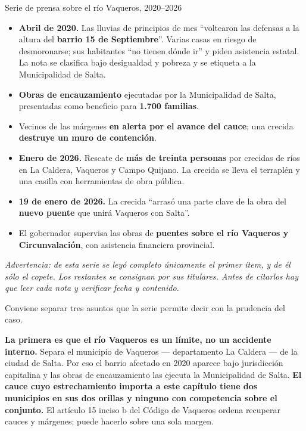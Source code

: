 \begin{ficha}{Serie de prensa sobre el río Vaqueros, 2020--2026}
\begin{itemize}[leftmargin=*,nosep]
\item \textbf{Abril de 2020.} Las lluvias de principios de mes ``voltearon las defensas a la altura del \textbf{barrio 15 de Septiembre}''. Varias casas en riesgo de desmoronarse; sus habitantes ``no tienen dónde ir'' y piden asistencia estatal. La nota se clasifica bajo desigualdad y pobreza y se etiqueta a la Municipalidad de Salta.
\item \textbf{Obras de encauzamiento} ejecutadas por la Municipalidad de Salta, presentadas como beneficio para \textbf{1.700 familias}.
\item Vecinos de las márgenes \textbf{en alerta por el avance del cauce}; una crecida \textbf{destruye un muro de contención}.
\item \textbf{Enero de 2026.} Rescate de \textbf{más de treinta personas} por crecidas de ríos en La Caldera, Vaqueros y Campo Quijano. La crecida se lleva el terraplén y una casilla con herramientas de obra pública.
\item \textbf{19 de enero de 2026.} La crecida ``arrasó una parte clave de la obra del \textbf{nuevo puente} que unirá Vaqueros con Salta''.
\item El gobernador supervisa las obras de \textbf{puentes sobre el río Vaqueros y Circunvalación}, con asistencia financiera provincial.
\end{itemize}
\textit{Advertencia: de esta serie se leyó completo únicamente el primer ítem, y de él sólo el copete. Los restantes se consignan por sus titulares. Antes de citarlos hay que leer cada nota y verificar fecha y contenido.}
\end{ficha}

Conviene separar tres asuntos que la serie permite decir con la prudencia del caso.

\textbf{La primera es que el río Vaqueros es un límite, no un accidente interno.} Separa el municipio de Vaqueros --- departamento La Caldera --- de la ciudad de Salta. Por eso el barrio afectado en 2020 aparece bajo jurisdicción capitalina y las obras de encauzamiento las ejecuta la Municipalidad de Salta. \textbf{El cauce cuyo estrechamiento importa a este capítulo tiene dos municipios en sus dos orillas y ninguno con competencia sobre el conjunto.} El artículo 15 inciso b del Código de Vaqueros ordena recuperar cauces y márgenes; puede hacerlo sobre una sola margen.

